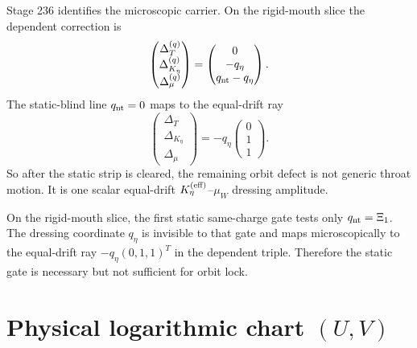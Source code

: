 Stage 236 identifies the microscopic carrier.  On the rigid-mouth slice the dependent correction is
\begin{equation}
\label{eq:app-part07-dependent-correction-q}
\begin{pmatrix}\Delta_T^{(q)}\\\Delta_{K_\eta}^{(q)}\\\Delta_\mu^{(q)}\end{pmatrix}
=
\begin{pmatrix}0\\-q_\eta\\q_{\rm nt}-q_\eta\end{pmatrix}.
\end{equation}
The static-blind line \(q_{\rm nt}=0\) maps to the equal-drift ray
\begin{equation}
\label{eq:app-part07-equal-drift-ray}
\begin{pmatrix}\Delta_T\\\Delta_{K_\eta}\\\Delta_\mu\end{pmatrix}
=
-q_\eta\begin{pmatrix}0\\1\\1\end{pmatrix}.
\end{equation}
So after the static strip is cleared, the remaining orbit defect is not generic throat motion.  It is one scalar equal-drift \(K_\eta^{(\rm eff)}\)--\(\mu_W\) dressing amplitude.

\begin{theorem}
\label{thm:app-part07-rigid-mouth-packet}
On the rigid-mouth slice, the first static same-charge gate tests only \(q_{\rm nt}=\Xi_1\).  The dressing coordinate \(q_\eta\) is invisible to that gate and maps microscopically to the equal-drift ray \(-q_\eta(0,1,1)^T\) in the dependent triple.  Therefore the static gate is necessary but not sufficient for orbit lock.
\end{theorem}


\section{Physical logarithmic chart \texorpdfstring{\((U,V)\)}{(U,V)}}
\label{sec:app-part07_same_charge_rigid_mouth:physical-logarithmic-chart-u-v}

